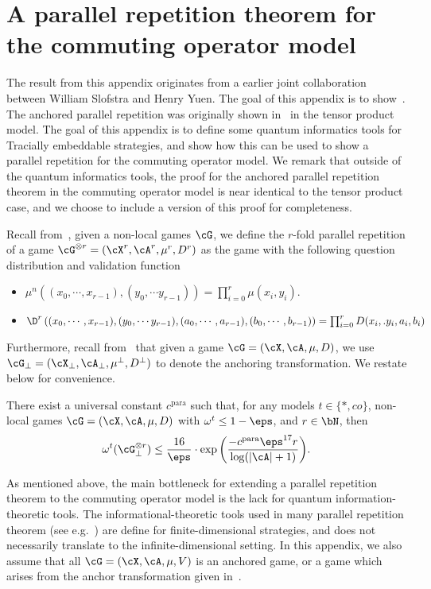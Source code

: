 
\section{A parallel repetition theorem for the commuting operator model} \label{sec:parallelrepappendix}
The result from this appendix originates from a earlier joint collaboration between William Slofstra and Henry Yuen. The goal of this appendix is to show~. The anchored parallel repetition was originally shown in~\cite{bavarianAnchoredParallelRepetition2021} in the tensor product model. The goal of this appendix is to define some quantum informatics tools for Tracially embeddable strategies, and show how this can be used to show a parallel repetition for the commuting operator model. We remark that outside of the quantum informatics tools, the proof for the anchored parallel repetition theorem in the commuting operator model is near identical to the tensor product case, and we choose to include a version of this proof for completeness.  

Recall from~, given a non-local games $\cG$, we define the $r$-fold parallel repetition of a game $\cG^{\otimes r} = (\cX^{r}, \cA^r, \mu^{r}, D^r)$ as the game with the following question distribution and validation function
\begin{itemize}
	\item $\mu^n((x_0, \cdots, x_{r-1}), (y_0, \cdots y_{r-1})) = \prod_{i = 0}^{r} \mu(x_i, y_i)$.
	\item  $\D^r\left((x_0, \cdots, x_{r-1}), (y_0, \cdots y_{r-1}), (a_0, \cdots , a_{r-1}),(b_0, \cdots , b_{r-1})\right) =\prod_{i = 0}^{r} D(x_i,. y_i, a_i,b_i)$
\end{itemize}
Furthermore, recall from~ that given a game $\cG = (\cX, \cA, \mu, D)$, we use $\cG_{\bot} = (\cX_{\bot}, \cA_{\bot} , \mu^{\bot}, D^{\bot})$ to denote the anchoring transformation. We restate below for convenience.
\begin{theorem} 
	There exist a universal constant $c^{\text{para}}$ such that, for any models $t \in \{*,co\}$, non-local games $\cG = (\cX, \cA, \mu, D)$ with $\omega^{t} \leq 1 - \eps$, and $r \in \bN$, then
	\begin{equation*}
		\omega^{t}(\cG_{\bot}^{\otimes r}) \leq \frac{16}{\eps} \cdot \exp{\left(\frac{- c^{\text{para}} \eps^{17} r }{\log(|\cA | + 1)}\right)}.
	\end{equation*}
\end{theorem}
As mentioned above, the main bottleneck for extending a parallel repetition theorem to the commuting operator model is the lack for quantum information-theoretic tools. The informational-theoretic tools used in many parallel repetition theorem (see e.g.~\cite{jainParallelRepetitionTheorem2014,yuenParallelRepetitionTheorem2016}) are define for finite-dimensional strategies, and does not necessarily translate to the infinite-dimensional setting. In this appendix, we also assume that all $\cG = (\cX, \cA, \mu, V)$ is an anchored game, or a game which arises from the anchor transformation given in~. 

